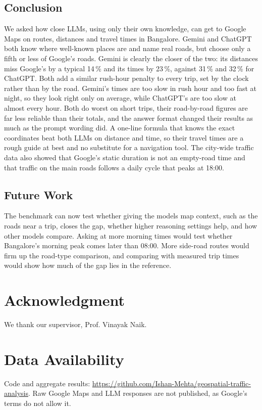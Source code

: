 \documentclass[conference]{IEEEtran}
\begin{document}
\subsection{Conclusion}
We asked how close LLMs, using only their own knowledge, can get to Google Maps on routes, distances and travel times in Bangalore. Gemini and ChatGPT both know where well-known places are and name real roads, but choose only a fifth or less of Google's roads. Gemini is clearly the closer of the two: its distances miss Google's by a typical 14\,\% and its times by 23\,\%, against 31\,\% and 32\,\% for ChatGPT. Both add a similar rush-hour penalty to every trip, set by the clock rather than by the road. Gemini's times are too slow in rush hour and too fast at night, so they look right only on average, while ChatGPT's are too slow at almost every hour. Both do worst on short trips, their road-by-road figures are far less reliable than their totals, and the answer format changed their results as much as the prompt wording did. A one-line formula that knows the exact coordinates beat both LLMs on distance and time, so their travel times are a rough guide at best and no substitute for a navigation tool. The city-wide traffic data also showed that Google's static duration is not an empty-road time and that traffic on the main roads follows a daily cycle that peaks at 18:00.

\subsection{Future Work}
The benchmark can now test whether giving the models map context, such as the roads near a trip, closes the gap, whether higher reasoning settings help, and how other models compare. Asking at more morning times would test whether Bangalore's morning peak comes later than 08:00. More side-road routes would firm up the road-type comparison, and comparing with measured trip times would show how much of the gap lies in the reference.

\section*{Acknowledgment}
We thank our supervisor, Prof. Vinayak Naik.

\section*{Data Availability}
Code and aggregate results: \url{https://github.com/Ishan-Mehta/geospatial-traffic-analysis}. Raw Google Maps and LLM responses are not published, as Google's terms do not allow it.
\end{document}
